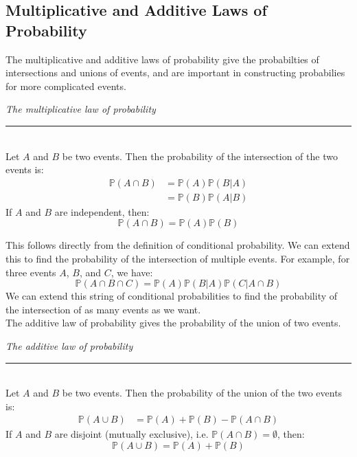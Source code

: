\documentclass[12pt]{article}
\theoremstyle{definition}
\theoremstyle{remark}
\def\P{{\mathbb P}}
\begin{document}
\subsection{Multiplicative and Additive Laws of Probability}
The multiplicative and additive laws of probability give the probabilties of intersections and unions of events, and are important in constructing probabilies for more complicated events.

\begin{framed}
\emph{The multiplicative law of probability}\\
  \rule{\dimexpr{}\fboxrule}{.1pt} \\
Let $A$ and $B$ be two events. Then the probability of the intersection of the two events is:
\begin{align*}
\P(A \cap B) &= \P(A)\P(B|A) \\
&= \P(B)\P(A|B)
\end{align*}
If $A$ and $B$ are independent, then:
\[
\P(A \cap B) = \P(A)\P(B)
\]
\end{framed}
This follows directly from the definition of conditional probability. We can extend this to find the probability of the intersection of multiple events. For example, for three events $A$, $B$, and $C$, we have:
\[
\P(A \cap B \cap C) = \P(A)\P(B|A)\P(C|A\cap B)
\]
We can extend this string of conditional probabilities to find the probability of the intersection of as many events as we want. \\



The additive law of probability gives the probability of the union of two events.
\begin{framed}
\emph{The additive law of probability}\\
  \rule{\dimexpr{}\fboxrule}{.1pt} \\
Let $A$ and $B$ be two events. Then the probability of the union of the two events is:
\begin{align*}
\P(A \cup B) &= \P(A) + \P(B) - \P(A \cap B) 
\end{align*}
If $A$ and $B$ are disjoint (mutually exclusive), i.e. $\P(A \cap B) = \emptyset$, then:
\[
\P(A \cup B) = \P(A) + \P(B)
\]
\end{framed}
\end{document}

